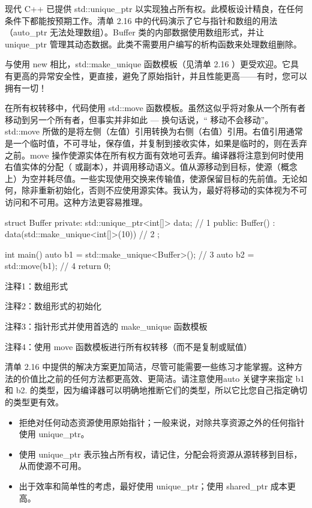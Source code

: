 现代 C++ 已提供 std::unique\_ptr 以实现独占所有权。此模板设计精良，在任何条件下都能按预期工作。清单 2.16 中的代码演示了它与指针和数组的用法（auto\_ptr 无法处理数组）。Buffer 类的内部数据使用数组形式，并让 unique\_ptr 管理其动态数据。此类不需要用户编写的析构函数来处理数组删除。

与使用 new 相比，std::make\_unique 函数模板（见清单 2.16 ）更受欢迎。它具有更高的异常安全性，更直接，避免了原始指针，并且性能更高——有时，您可以拥有一切！

在所有权转移中，代码使用 std::move 函数模板。虽然这似乎将对象从一个所有者移动到另一个所有者，但事实并非如此 — 换句话说，“ 移动不会移动”。std::move 所做的是将左侧（左值）引用转换为右侧（右值）引用。右值引用通常是一个临时值，不可寻址，保存值，并复制到接收实体，如果是临时的，则在丢弃之前。move 操作使源实体在所有权方面有效地可丢弃。编译器将注意到何时使用右值实体的分配（ 或副本），并调用移动语义。值从源移动到目标，使源（概念上）为空并耗尽值。一些实现使用交换来传输值，使源保留目标的先前值。无论如何，除非重新初始化，否则不应使用源实体。我认为，最好将移动的实体视为不可访问和不可用。这种方法更容易推理。


\begin{cpp}
struct Buffer {
private:
  std::unique_ptr<int[]> data; // 1
public:
  Buffer() : data(std::make_unique<int[]>(10)) {} // 2
};

int main() {
  auto b1 = std::make_unique<Buffer>(); // 3
  auto b2 = std::move(b1); // 4
  return 0;
}
\end{cpp}

{\footnotesize
注释1：数组形式

注释2：数组形式的初始化

注释3：指针形式并使用首选的 make\_unique 函数模板

注释4：使用 move 函数模板进行所有权转移（而不是复制或赋值）
}

清单 2.16 中提供的解决方案更加简洁，尽管可能需要一些练习才能掌握。这种方法的价值比之前的任何方法都更高效、更简洁。请注意使用auto 关键字来指定 b1 和 b2. 的类型，因为编译器可以明确地推断它们的类型，所以它比您自己指定确切的类型更有效。


\begin{itemize}
\item
拒绝对任何动态资源使用原始指针；一般来说，对除共享资源之外的任何指针使用 unique\_ptr。

\item
使用 unique\_ptr 表示独占所有权，请记住，分配会将资源从源转移到目标，从而使源不可用。

\item
出于效率和简单性的考虑，最好使用 unique\_ptr；使用 shared\_ptr 成本更高。
\end{itemize}













